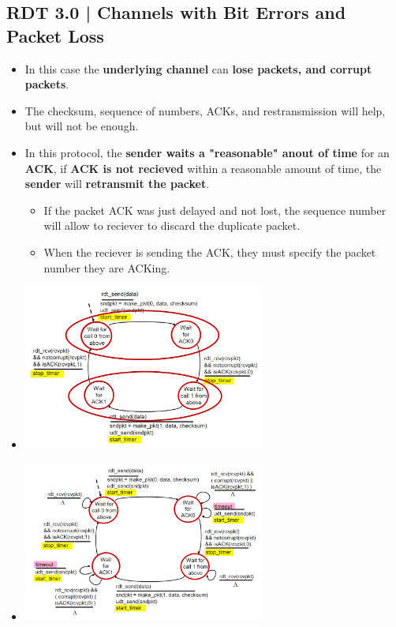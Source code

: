 \documentclass[16pt]{article}
\begin{document}
    \subsection*{RDT 3.0 | Channels with Bit Errors and Packet Loss}
    \begin{itemize}
        \item In this case the \textbf{underlying channel} can \textbf{lose packets, and corrupt packets}.
        \item The checksum, sequence of numbers, ACKs, and restransmission will help, but will not be enough.
        \item In this protocol, the \textbf{sender waits a "reasonable" anout of time} for an \textbf{ACK}, if \textbf{ACK is not recieved} within a reasonable amount of time, the \textbf{sender} will \textbf{retransmit the packet}.
        \begin{itemize}
            \item If the packet ACK was just delayed and not lost, the sequence number will allow to reciever to discard the duplicate packet.
            \item When the reciever is sending the ACK, they must specify the packet number they are ACKing.
        \end{itemize}
        \item[] \begin{center}
                    \includegraphics*[width=300px]{images/RDT-3.0.PNG} 
                \end{center}
        \item[] \begin{center}
                    \includegraphics*[width=300px]{images/RDT-3.0-1.PNG} 
                \end{center}

    \end{itemize}
\end{document}
